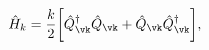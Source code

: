 \begin{equation}
\hat{H}_{k} = \frac{k}{2}\biggl[ \hat{Q}^{\dagger}_{\vk} \hat{Q}_{\vk} 
+ \hat{Q}_{\vk} \hat{Q}^{\dagger}_{\vk}\biggr],
\label{min1}
\end{equation}

